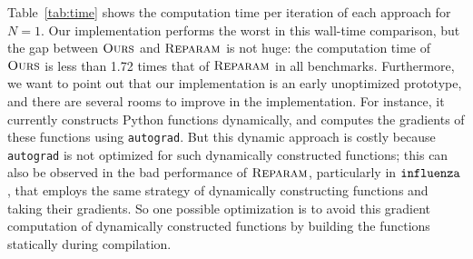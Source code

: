 Table~\ref{tab:time} shows the computation time per iteration of each approach for $N=1$.
Our implementation performs the worst in this wall-time comparison,
but the gap between $\textsc{Ours}$ and $\textsc{Reparam}$ is not huge:
the computation time of $\textsc{Ours}$ is less than 1.72 times that of $\textsc{Reparam}$ in all benchmarks.
Furthermore, we want to point out that our implementation is an early unoptimized prototype, and there are several rooms to improve in the implementation.
For instance, it currently constructs Python functions dynamically, and computes the gradients of these functions using {\tt autograd}. But this dynamic approach is costly because {\tt autograd} is not optimized for such dynamically constructed functions; this can also be observed in the bad performance of $\textsc{Reparam}$, particularly in $\mathtt{influenza}$, that employs the same strategy of dynamically constructing functions
and taking their gradients.
So one possible optimization is to avoid this gradient computation of dynamically
constructed functions by building the functions statically during compilation.
